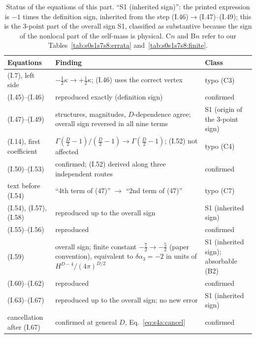 \documentclass[aps,prd,onecolumn,10pt,nofootinbib,floatfix]{revtex4-2}
\newcommand{\eqI}[1]{(I.#1)}
\begin{document}
\begin{table}[htbp]
\caption{Status of the equations of this part. ``S1 (inherited sign)'': the printed expression is $-1$ times the
definition sign, inherited from the step \eqI{46}$\to$\eqI{47}--\eqI{49}; this is the 3-point part of the overall sign S1,
classified as substantive because the sign of the nonlocal part of the self-mass is physical. C$n$ and B$n$ refer to our
Tables~\ref{tab:s0s1s7s8:errata} and~\ref{tab:s0s1s7s8:finite}.}
\label{tab:s4a:status}
\renewcommand{\arraystretch}{1.25}
\begin{ruledtabular}
\begin{tabular}{>{\raggedright\arraybackslash}p{}>{\raggedright\arraybackslash}p{}>{\raggedright\arraybackslash}p{}}
Equations & Finding & Class\\
\hline
\eqI{7}, left side & $-\frac12\kappa\to+\frac12\kappa$; \eqI{46} uses the correct vertex & typo (C3)\\
\eqI{45}--\eqI{46} & reproduced exactly (definition sign) & confirmed\\
\eqI{47}--\eqI{49} & structures, magnitudes, $D$-dependence agree; overall sign reversed in all nine terms & S1 (origin of the 3-point sign)\\
\eqI{14}, first coefficient & $\Gamma(\frac D2-1)/(\frac D2-1)\to\Gamma(\frac D2-1)$; \eqI{52} not affected & typo (C4)\\
\eqI{50}--\eqI{53} & confirmed; \eqI{52} derived along three independent routes & confirmed\\
text before \eqI{54} & ``4th term of (47)'' $\to$ ``2nd term of (47)'' & typo (C7)\\
\eqI{54}, \eqI{57}, \eqI{58} & reproduced up to the overall sign & S1 (inherited sign)\\
\eqI{55}--\eqI{56} & reproduced & confirmed\\
\eqI{59} & overall sign; finite constant $-\frac72\to-\frac52$ (paper convention), equivalent to $\delta\alpha_3=-2$ in units of $H^{D-4}/(4\pi)^{D/2}$ & S1 (inherited sign); absorbable (B2)\\
\eqI{60}--\eqI{62} & reproduced & confirmed\\
\eqI{63}--\eqI{67} & reproduced up to the overall sign; no new error & S1 (inherited sign)\\
cancellation after \eqI{67} & confirmed at general $D$, Eq.~\eqref{eq:s4a:cancel} & confirmed\\
\end{tabular}
\end{ruledtabular}
\end{table}
\end{document}
